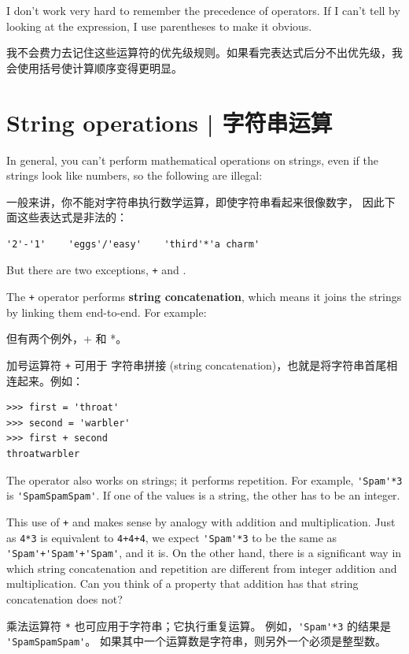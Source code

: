 I don't work very hard to remember the precedence of
operators.  If I can't tell by looking at the expression, I use
parentheses to make it obvious.

我不会费力去记住这些运算符的优先级规则。如果看完表达式后分不出优先级，我会使用括号使计算顺序变得更明显。


%
\section{String operations  |  字符串运算}
  
  

In general, you can't perform mathematical operations on strings, even
if the strings look like numbers, so the following are illegal:

一般来讲，你不能对字符串执行数学运算，即使字符串看起来很像数字， 因此下面这些表达式是非法的：


\begin{lstlisting}
'2'-'1'    'eggs'/'easy'    'third'*'a charm'
\end{lstlisting}
%
But there are two exceptions, {\tt +} and {\tt *}.

The {\tt +} operator performs {\bf string concatenation}, which means
it joins the strings by linking them end-to-end.  For example:

但有两个例外，+ 和 *。

加号运算符 \lstinline{+} 可用于 字符串拼接 (string concatenation)，也就是将字符串首尾相连起来。例如：

\begin{lstlisting}
>>> first = 'throat'
>>> second = 'warbler'
>>> first + second
throatwarbler
\end{lstlisting}
%
The {\tt *} operator also works on strings; it performs repetition.
For example, \verb"'Spam'*3" is \verb"'SpamSpamSpam'".  If one of the
values is a string, the other has to be an integer.

This use of {\tt +} and {\tt *} makes sense by
analogy with addition and multiplication.  Just as {\tt 4*3} is
equivalent to {\tt 4+4+4}, we expect \verb"'Spam'*3" to be the same as
\verb"'Spam'+'Spam'+'Spam'", and it is.  On the other hand, there is a
significant way in which string concatenation and repetition are
different from integer addition and multiplication.
Can you think of a property that addition has
that string concatenation does not?

乘法运算符 \lstinline{*} 也可应用于字符串；它执行重复运算。 例如，\lstinline{'Spam'*3} 的结果是 \lstinline{'SpamSpamSpam'}。  如果其中一个运算数是字符串，则另外一个必须是整型数。

